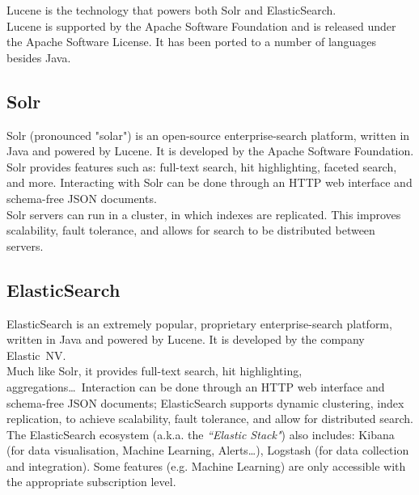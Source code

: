 Lucene is the technology that powers both Solr and ElasticSearch. \\

Lucene is supported by the Apache Software Foundation and is released under the Apache Software License. It has been ported to a number of languages besides Java.



\subsection{Solr}

Solr (pronounced "solar") is an open-source enterprise-search platform, written in Java and powered by Lucene. It is developed by the Apache Software Foundation. \\

Solr provides features such as: full-text search, hit highlighting, faceted search, and more. Interacting with Solr can be done through an HTTP web interface and schema-free JSON documents. \\

Solr servers can run in a cluster, in which indexes are replicated. This improves scalability, fault tolerance, and allows for search to be distributed between servers.



\subsection{ElasticSearch}

ElasticSearch is an extremely popular, proprietary enterprise-search platform, written in Java and powered by Lucene. It is developed by the company Elastic~NV. \\

Much like Solr, it provides full-text search, hit highlighting, aggregations\dots\ Interaction can be done through an HTTP web interface and schema-free JSON documents; ElasticSearch supports dynamic clustering, index replication, to achieve scalability, fault tolerance, and allow for  distributed search. \\

The ElasticSearch ecosystem (a.k.a. the \emph{``Elastic Stack"}) also includes: Kibana (for data visualisation, Machine Learning, Alerts\dots), Logstash (for data collection and integration). Some features (e.g. Machine Learning) are only accessible with the appropriate subscription level. \\


